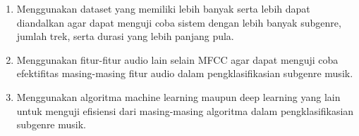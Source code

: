 \begin{enumerate}[nolistsep]

  \item Menggunakan dataset yang memiliki lebih banyak serta lebih dapat diandalkan agar dapat menguji coba sistem dengan lebih banyak subgenre, jumlah trek, serta durasi yang lebih panjang pula.

  \item Menggunakan fitur-fitur audio lain selain MFCC agar dapat menguji coba efektifitas masing-masing fitur audio dalam pengklasifikasian subgenre musik.

  \item Menggunakan algoritma machine learning maupun deep learning yang lain untuk menguji efisiensi dari masing-masing algoritma dalam pengklasifikasian subgenre musik.

\end{enumerate}
